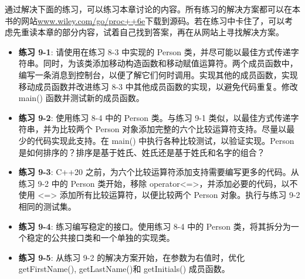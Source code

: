 
通过解决下面的练习，可以练习本章讨论的内容。所有练习的解决方案都可以在本书的网站\url{www.wiley.com/go/proc++6e}下载到源码。若在练习中卡住了，可以考虑先重读本章的部分内容，试着自己找到答案，再在从网站上寻找解决方案。

\begin{itemize}
\item
\textbf{练习 9-1}: 请使用在练习 8-3 中实现的 Person 类，并尽可能以最佳方式传递字符串。同时，为该类添加移动构造函数和移动赋值运算符。两个成员函数中，编写一条消息到控制台，以便了解它们何时调用。实现其他的成员函数，实现移动成员函数并改进练习 8-3 中其他成员函数的实现，以避免代码重复。修改 main() 函数并测试新的成员函数。

\item
\textbf{练习 9-2}: 使用练习 8-4 中的 Person 类。与练习 9-1 类似，以最佳方式传递字符串，并为比较两个 Person 对象添加完整的六个比较运算符支持。尽量以最少的代码实现此支持。在 main() 中执行各种比较测试，以验证实现。Person 是如何排序的？排序是基于姓氏、姓氏还是基于姓氏和名字的组合？

\item
\textbf{练习 9-3}:  C++20 之前，为六个比较运算符添加支持需要编写更多的代码。从练习 9-2 中的 Person 类开始，移除 operator<=>，并添加必要的代码，以不使用 <=> 添加所有比较运算符，以便比较两个 Person 对象。执行与练习 9-2 相同的测试集。

\item
\textbf{练习 9-4}: 练习编写稳定的接口。使用练习 8-4 中的 Person 类，将其拆分为一个稳定的公共接口类和一个单独的实现类。

\item
\textbf{练习 9-5}: 从练习 9-2 的解决方案开始，在参数为右值时，优化 getFirstName(), getLastName()和 getInitials() 成员函数。
\end{itemize}






